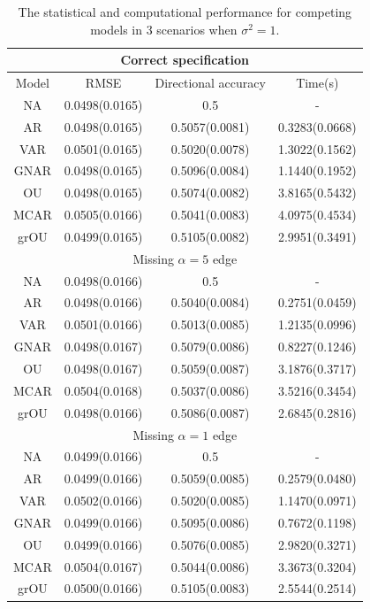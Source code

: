 \documentclass[12pt]{amsart}
\numberwithin{equation}{section}
\newcommand{\1}{\mathbf{1}}
\begin{document}
\begin{table}[htbp]
\centering
\begin{tabular}{|c|c|c|c|}
\hline
\multicolumn{4}{|c|}{Correct specification}
\\
\hline
Model & RMSE & Directional accuracy & Time(s) \\ \hline
NA   & 0.0498(0.0165) & 0.5 & -\\
AR   & 0.0498(0.0165) & 0.5057(0.0081) & 0.3283(0.0668)\\
VAR  & 0.0501(0.0165) & 0.5020(0.0078) & 1.3022(0.1562)\\
GNAR & 0.0498(0.0165) & 0.5096(0.0084) & 1.1440(0.1952)\\
OU   & 0.0498(0.0165) & 0.5074(0.0082) & 3.8165(0.5432)\\
MCAR & 0.0505(0.0166) & 0.5041(0.0083) & 4.0975(0.4534)\\
grOU & 0.0499(0.0165) & 0.5105(0.0082) & 2.9951(0.3491)\\ \hline

\multicolumn{4}{|c|}{Missing $\alpha = 5$ edge}
\\
\hline
NA   & 0.0498(0.0166) & 0.5 & -\\
AR   & 0.0498(0.0166) & 0.5040(0.0084) & 0.2751(0.0459)\\
VAR  & 0.0501(0.0166) & 0.5013(0.0085) & 1.2135(0.0996)\\
GNAR & 0.0498(0.0167) & 0.5079(0.0086) & 0.8227(0.1246)\\
OU   & 0.0498(0.0167) & 0.5059(0.0087) & 3.1876(0.3717)\\
MCAR & 0.0504(0.0168) & 0.5037(0.0086) & 3.5216(0.3454)\\
grOU & 0.0498(0.0166) & 0.5086(0.0087) & 2.6845(0.2816)\\ \hline

\multicolumn{4}{|c|}{Missing $\alpha = 1$ edge}
\\
\hline
NA   & 0.0499(0.0166) & 0.5 & -\\
AR   & 0.0499(0.0166) & 0.5059(0.0085) & 0.2579(0.0480)\\
VAR  & 0.0502(0.0166) & 0.5020(0.0085) & 1.1470(0.0971)\\
GNAR & 0.0499(0.0166) & 0.5095(0.0086) & 0.7672(0.1198)\\
OU   & 0.0499(0.0166) & 0.5076(0.0085) & 2.9820(0.3271)\\
MCAR & 0.0504(0.0167) & 0.5044(0.0086) & 3.3673(0.3204)\\
grOU & 0.0500(0.0166) & 0.5105(0.0083) & 2.5544(0.2514)\\ \hline
\end{tabular}
\caption{The statistical and computational performance for competing models in 3 scenarios when $\sigma^2=1$.}
\label{sim_table_1}
\end{table}
\end{document}
